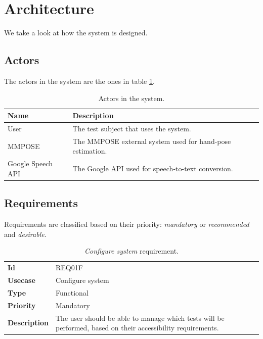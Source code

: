 \section{Architecture}
We take a look at how the system is designed.

\subsection{Actors}
The actors in the system are the ones in table \ref{tab:actors}.
\begin{table}[h!t]
    \caption{Actors in the system.}
    \label{tab:actors}
    \centering
    \begin{tabular}{l p{70mm}}
        \textbf{Name}     & \textbf{Description}                                      \\
        \hline
        User              & The test subject that uses the system.                    \\
        MMPOSE            & The MMPOSE external system used for hand-pose estimation. \\
        Google Speech API & The Google API used for speech-to-text conversion.
    \end{tabular}
\end{table}

\subsection{Requirements}
Requirements are classified based on their priority: \emph{mandatory} or \emph{recommended} and \emph{desirable}.

\begin{table}[h!t]
    \centering
    \caption{\emph{Configure system} requirement.}
    \label{tab:req:configure}
    \centering
    \begin{tabular}{l | p{80mm}}
        \textbf{Id}          & REQ01F                                                                                                      \\
        \textbf{Usecase}     & Configure system                                                                                            \\
        \textbf{Type}        & Functional                                                                                                  \\
        \textbf{Priority}    & Mandatory                                                                                                   \\
        \textbf{Description} & The user should be able to manage which tests will be performed, based on their accessibility requirements.
    \end{tabular}
\end{table}

